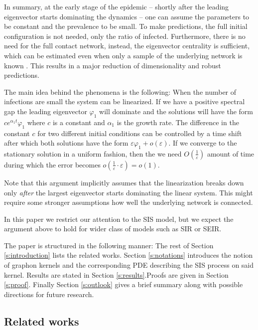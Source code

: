\documentclass{article}
\newcommand{\1}[1]{{\mathds{1}}_{\left\{#1\right\}}}
\newcommand{\rem}[1]{{#1}}
\begin{document}
In summary, at the early stage of the epidemic -- shortly after the leading eigenvector starts dominating the dynamics -- one can assume the parameters to be constant and the prevalence to be small. To make predictions, the full initial configuration is not needed, only the ratio of infected. Furthermore, there is no need for the full contact network, instead, the eigenvector centrality is sufficient, which can be estimated \rem{even when only a sample of the underlying network is known  \cite{graphonL2conv}.} This results in a major reduction of dimensionality and robust predictions.

\rem{
The main idea behind the phenomena is the following: When the number of infections are small the system can be linearized. If we have a positive spectral gap the leading eigenvector $\varphi_1$ will dominate and the solutions will have the form $ce^{\alpha_1 t} \varphi_1$ where $c$ is a constant and $\alpha_1$ is the growth rate. The difference in the constant $c$ for two different initial conditions can be controlled by a time shift after which both solutions have the form $\varepsilon\varphi_1+o(\varepsilon).  $ If we converge to the stationary solution in a uniform fashion, then the we need $O \left( \frac{1}{\varepsilon} \right)$ amount of time during which the error becomes $o \left( \frac{1}{\varepsilon} \cdot \varepsilon \right)=o(1).$

Note that this argument implicitly assumes that the linearization breaks down only \emph{after} the largest eigenvector starts dominating the linear system. This might require some stronger assumptions how well the underlying network is connected.

In this paper we restrict our attention to the SIS model, but we expect the argument above to hold for wider class of models such as SIR or SEIR. 
}



The paper is structured in the following manner: The rest of Section \ref{s:introduction} lists the related works. Section \ref{s:notations} introduces the notion of graphon kernels and the corresponding PDE describing the SIS process on said kernel. Results are stated in Section \ref{s:results}.Proofs are given in Section \ref{s:proof}. Finally Section \ref{s:outlook} gives a brief summary along with possible directions for future research.

\subsection*{Related works}
\end{document}
